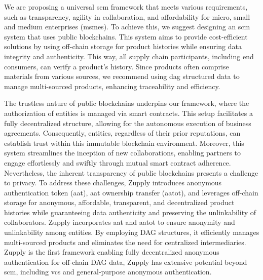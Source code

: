 We are proposing a universal \gls{scm} framework that meets various requirements, such as transparency, agility in collaboration, and affordability for micro, small and medium enterprises (\gls{msme}s). To achieve this, we suggest designing an \gls{scm} system that uses public blockchains. This system aims to provide cost-efficient solutions by using off-chain storage for product histories while ensuring data integrity and authenticity. This way, all supply chain participants, including end consumers, can verify a product's history. Since products often comprise materials from various sources, we recommend using \gls{dag} structured data to manage multi-sourced products, enhancing traceability and efficiency. 

The trustless nature of public blockchains underpins our framework, where the authorization of entities is managed via smart contracts. This setup facilitates a fully decentralized structure, allowing for the autonomous execution of business agreements. Consequently, entities, regardless of their prior reputations, can establish trust within this immutable blockchain environment. Moreover, this system streamlines the inception of new collaborations, enabling partners to engage effortlessly and swiftly through mutual smart contract adherence. Nevertheless, the inherent transparency of public blockchains presents a challenge to privacy. 
To address these challenges, Zupply introduces anonymous authentication token (\gls{aat}), \gls{aat} ownership transfer (\gls{aatot}), and leverages off-chain storage for anonymous, affordable, transparent, and decentralized product histories while guaranteeing data authenticity and  preserving the unlinkability of collaborators. Zupply incorporates \gls{aat} and \gls{aatot} to ensure anonymity and unlinkability among entities. By employing DAG structures, it efficiently manages multi-sourced products and eliminates the need for centralized intermediaries. Zupply is the first framework enabling fully decentralized anonymous authentication for off-chain DAG data, Zupply has extensive potential beyond \gls{scm}, including \gls{vcs} and general-purpose anonymous authentication. 

